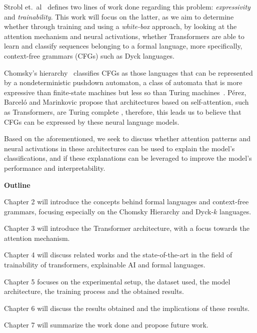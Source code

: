 Strobl et.\ al\ \cite{strobl2024formal} defines two lines of work done regarding this problem: \textit{expressivity} and \textit{trainability}. This work will focus on the latter, as we aim to determine whether through training and using a \textit{white-box} approach, by looking at the attention mechanism and neural activations, whether Transformers are able to learn and classify sequences belonging to a formal language, more specifically, context-free grammars (CFGs) such as Dyck languages.

Chomsky's hierarchy\ \cite{chomsky-hierarchy} classifies CFGs as those languages that can be represented by a nondeterministic pushdown automaton, a class of automata that is more expressive than finite-state machines but less so than Turing machines~\cite{context-free-chomsky}. Pérez, Barceló and Marinkovic propose that architectures based on self-attention, such as Transformers, are Turing complete \cite{attention-tc}, therefore, this leads us to believe that CFGs can be expressed by these neural language models.

Based on the aforementioned, we seek to discuss whether attention patterns and neural activations in these architectures can be used to explain the model's classifications, and if these explanations can be leveraged to improve the model's performance and interpretability.

\bigskip

\textbf{Outline}

Chapter 2 will introduce the concepts behind formal languages and context-free grammars, focusing especially on the Chomsky Hierarchy and Dyck-$k$ languages.

Chapter 3 will introduce the Transformer architecture, with a focus towards the attention mechanism.

Chapter 4 will discuss related works and the state-of-the-art in the field of trainability of transformers, explainable AI and formal languages.

Chapter 5 focuses on the experimental setup, the dataset used, the model architecture, the training process and the obtained results.

Chapter 6 will discuss the results obtained and the implications of these results.

Chapter 7 will summarize the work done and propose future work.
